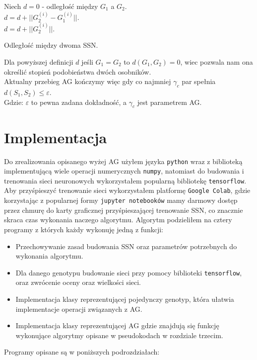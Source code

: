 \documentclass{article}
\begin{document}
\begin{algorithm}[H]
	Niech $d = 0$ - odległość między $G_1$ a $G_2$.\\
	 {
		$d = d + ||G_2^{(i)} - G_1^{(i)}||$.\\
	}
	 {
		$d = d + ||G_2^{(i)}||$.\\
	}
	\caption{Odległość między dwoma SSN.}
\end{algorithm}

Dla powyższej definicji $d$ jeśli $G_1 = G_2$ to $d(G_1, G_2) = 0$, wiec pozwala nam ona określić
stopień podobieństwa dwóch osobników.\\
Aktualny przebieg AG kończymy więc gdy co najmniej $\gamma_c$ par spełnia 
$d(S_1, S_2) \leq \varepsilon$.\\
Gdzie: $\varepsilon$ to pewna zadana dokładność, a $\gamma_c$ jest parametrem AG.


\section{Implementacja}
\label{sec:imp}
Do zrealizowania opisanego wyżej AG użyłem języka \texttt{python} wraz z biblioteką 
implementującą wiele operacji numerycznych \texttt{numpy}, natomiast do budowania i trenowania
sieci neuronowych wykorzystałem popularną bibliotekę \texttt{tensorflow}. Aby przyśpieszyć
trenowanie sieci wykorzystałem platformę \texttt{Google Colab}, gdzie korzystając z popularnej
formy \texttt{jupyter notebooków} mamy darmowy dostęp przez chmurę do karty graficznej
przyśpieszającej trenowanie SSN, co znacznie skraca czas wykonania naczego algorytmu.
Algorytm podzieliłem na cztery programy z których każdy wykonuję jedną z funkcji:
\begin{itemize}
\item Przechowywanie zasad budowania SSN oraz parametrów potrzebnych do wykonania algorytmu.
\item Dla danego genotypu budowanie sieci przy pomocy biblioteki \texttt{tensorflow}, oraz
zwrócenie oceny oraz wielkości sieci.
\item Implementacja klasy reprezentującej pojedynczy genotyp, która ułatwia implementacje
operacji związanych z AG.
\item Implementacja klasy reprezentującej AG gdzie znajdują się funkcję wykonujące algorytmy
opisane w pseudokodach w rozdziale trzecim.
\end{itemize}
Programy opisane są w poniższych podrozdziałach:\\
\end{document}
